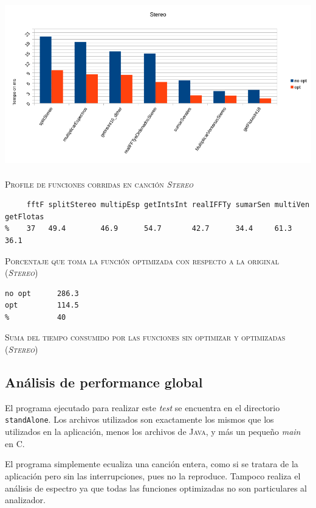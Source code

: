 \documentclass[%
    compressed,
    titlepage,
    narroweqnarray,
    inline,
    twoside,
    ]{ieee}
\begin{document}
\begin{center} 
\includegraphics[width=1.1\textwidth]{img/todasStereo.png}~\\
\textsc{Profile de funciones corridas en canci\'on \textit{Stereo}} \end{center}

{\small
\begin{lstlisting}
     fftF splitStereo multipEsp getIntsInt realIFFTy sumarSen multiVen getFlotas
%    37   49.4        46.9      54.7       42.7      34.4     61.3     36.1
\end{lstlisting}
}
\begin{center} \textsc{Porcentaje que toma la funci\'on optimizada con respecto a la original (\textit{Stereo})} \end{center}

{\small
\begin{lstlisting}
no opt      286.3
opt         114.5
%           40
\end{lstlisting}
}
\begin{center} \textsc{Suma del tiempo consumido por las funciones sin optimizar y optimizadas (\textit{Stereo})} \end{center}


\subsection{An\'alisis de performance global}

El programa ejecutado para realizar este \textit{test} se encuentra en el directorio
\texttt{standAlone}. Los archivos utilizados son exactamente los mismos que los utilizados
en la aplicaci\'on, menos los archivos de \textsc{Java}, y m\'as un peque\~no \textit{main}
en \textsc{C}.

El programa simplemente ecualiza una canci\'on entera, como si se tratara de la aplicaci\'on
pero sin las interrupciones, pues no la reproduce. Tampoco realiza el an\'alisis de espectro
ya que todas las funciones optimizadas no son particulares al analizador.
\end{document}
